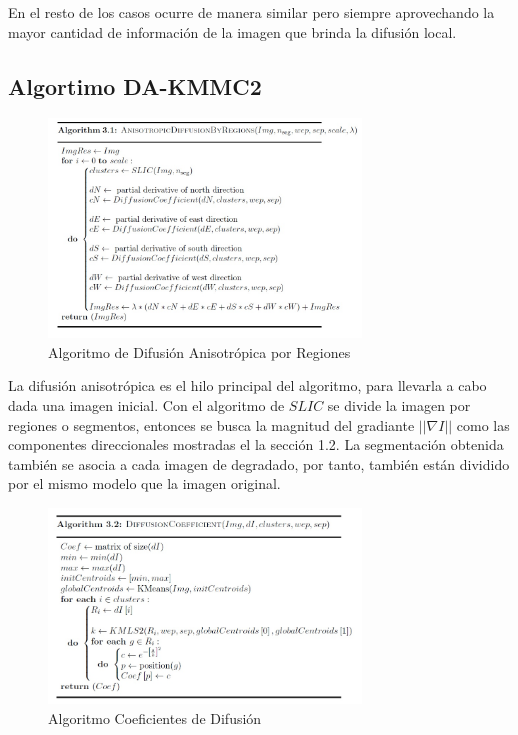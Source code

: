 \documentclass[a4paper,10pt,twocolumn]{article}
\begin{document}
En el resto de los casos ocurre de manera similar pero siempre aprovechando la mayor cantidad de informaci\'on de la imagen que brinda la difusi\'on local.
\subsection{Algortimo DA-KMMC2}\label{sec:algoritmo_da_kmmc2}

\begin{figure}[htb]
	\begin{center}
		\includegraphics[width=8.3cm]{image/Alg1}
	\end{center}
	\caption{Algoritmo de Difusi\'on Anisotr\'opica por Regiones \label{fig:difusion_anisotropica_regiones}}
\end{figure}

La difusi\'on anisotr\'opica es el hilo principal del algoritmo, para llevarla a cabo dada una imagen inicial. Con el algoritmo de $SLIC$ se divide la imagen por regiones o segmentos, entonces se busca la magnitud del gradiante $||\nabla I||$ como las componentes direccionales mostradas el la secci\'on 1.2. La segmentaci\'on obtenida tambi\'en se asocia a cada imagen de degradado, por tanto, tambi\'en est\'an dividido por el mismo modelo que la imagen original.

\begin{figure}[htb]
	\begin{center}
		\includegraphics[width=8.3cm]{image/Alg2}
	\end{center}
	\caption{Algoritmo Coeficientes de Difusi\'on \label{fig:coeficientes_difusion}}
\end{figure}
\end{document}
